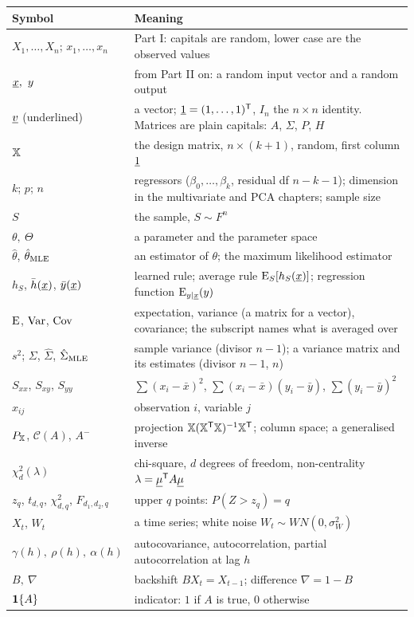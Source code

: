 \begin{center}
\small
\begin{tabular}{@{}p{}p{}@{}}
\toprule
\textbf{Symbol} & \textbf{Meaning} \\
\midrule
$X_1,\dots,X_n$; $x_1,\dots,x_n$ & Part I: capitals are random, lower case are the observed values \\
$\vect{x},\ y$ & from Part II on: a random input vector and a random output \\
$\underline{v}$ (underlined) & a vector; $\underline{1}=(1,\dots,1)^{\mathsf{T}}$, $I_n$ the $n\times n$ identity. Matrices are plain capitals: $A$, $\Sigma$, $P$, $H$ \\
$\mathbb{X}$ & the design matrix, $n\times(k+1)$, random, first column $\underline{1}$ \\
$k$; $p$; $n$ & regressors ($\beta_0,\dots,\beta_k$, residual df $n-k-1$); dimension in the multivariate and PCA chapters; sample size \\
$S$ & the sample, $S\sim F^n$ \\
$\theta,\ \Theta$ & a parameter and the parameter space \\
$\hat\theta$, $\hat\theta_{\mathrm{MLE}}$ & an estimator of $\theta$; the maximum likelihood estimator \\
$h_S$, $\bar h(\underline{x})$, $\bar y(\underline{x})$ & learned rule; average rule $\operatorname{E}_S[h_S(\underline{x})]$; regression function $\operatorname{E}_{y\mid\underline{x}}(y)$ \\
$\operatorname{E}$, $\operatorname{Var}$, $\operatorname{Cov}$ & expectation, variance (a matrix for a vector), covariance; the subscript names what is averaged over \\
$s^2$; $\Sigma$, $\hat\Sigma$, $\hat\Sigma_{\mathrm{MLE}}$ & sample variance (divisor $n-1$); a variance matrix and its estimates (divisor $n-1$, $n$) \\
$S_{xx}$, $S_{xy}$, $S_{yy}$ & $\sum(x_i-\bar x)^2$, $\sum(x_i-\bar x)(y_i-\bar y)$, $\sum(y_i-\bar y)^2$ \\
$x_{ij}$ & observation $i$, variable $j$ \\
$P_{\mathbb{X}}$, $\mathcal C(A)$, $A^{-}$ & projection $\mathbb{X}(\mathbb{X}^{\mathsf{T}}\mathbb{X})^{-1}\mathbb{X}^{\mathsf{T}}$; column space; a generalised inverse \\
$\chi^2_{d}(\lambda)$ & chi-square, $d$ degrees of freedom, non-centrality $\lambda=\underline{\mu}^{\mathsf{T}} A\underline{\mu}$ \\
$z_q$, $t_{d,q}$, $\chi^2_{d,q}$, $F_{d_1,d_2,q}$ & upper $q$ points: $P(Z>z_q)=q$ \\
$X_t$, $W_t$ & a time series; white noise $W_t\sim WN(0,\sigma^2_W)$ \\
$\gamma(h),\ \rho(h),\ \alpha(h)$ & autocovariance, autocorrelation, partial autocorrelation at lag $h$ \\
$B,\ \nabla$ & backshift $BX_t=X_{t-1}$; difference $\nabla=1-B$ \\
$\mathbf{1}\{A\}$ & indicator: $1$ if $A$ is true, $0$ otherwise \\
\bottomrule
\end{tabular}
\end{center}
